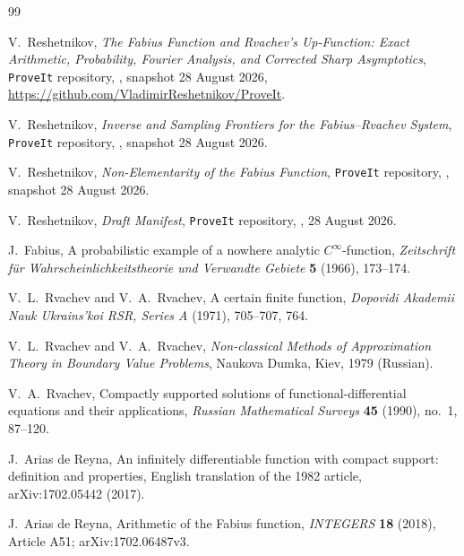\documentclass[11pt,oneside]{article}
\theoremstyle{definition}
\theoremstyle{remark}
\newcommand{\Repo}{\texttt{ProveIt}}
\begin{document}
\begin{thebibliography}{99}

V.~Reshetnikov,
\newblock \emph{The Fabius Function and Rvachev's Up-Function: Exact Arithmetic, Probability, Fourier Analysis, and Corrected Sharp Asymptotics},
\newblock \Repo{} repository, , snapshot 28 August 2026,
\newblock \url{https://github.com/VladimirReshetnikov/ProveIt}.

V.~Reshetnikov,
\newblock \emph{Inverse and Sampling Frontiers for the Fabius--Rvachev System},
\newblock \Repo{} repository, , snapshot 28 August 2026.

V.~Reshetnikov,
\newblock \emph{Non-Elementarity of the Fabius Function},
\newblock \Repo{} repository, , snapshot 28 August 2026.

V.~Reshetnikov,
\newblock \emph{Draft Manifest},
\newblock \Repo{} repository, , 28 August 2026.

J.~Fabius,
\newblock A probabilistic example of a nowhere analytic $C^\infty$-function,
\newblock \emph{Zeitschrift f\"ur Wahrscheinlichkeitstheorie und Verwandte Gebiete} \textbf{5} (1966), 173--174.

V.~L.~Rvachev and V.~A.~Rvachev,
\newblock A certain finite function,
\newblock \emph{Dopovidi Akademii Nauk Ukrains'koi RSR, Series A} (1971), 705--707, 764.

V.~L.~Rvachev and V.~A.~Rvachev,
\newblock \emph{Non-classical Methods of Approximation Theory in Boundary Value Problems},
\newblock Naukova Dumka, Kiev, 1979 (Russian).

V.~A.~Rvachev,
\newblock Compactly supported solutions of functional-differential equations and their applications,
\newblock \emph{Russian Mathematical Surveys} \textbf{45} (1990), no.~1, 87--120.

J.~Arias de Reyna,
\newblock An infinitely differentiable function with compact support: definition and properties,
\newblock English translation of the 1982 article, arXiv:1702.05442 (2017).

J.~Arias de Reyna,
\newblock Arithmetic of the Fabius function,
\newblock \emph{INTEGERS} \textbf{18} (2018), Article A51; arXiv:1702.06487v3.


\end{thebibliography}
\end{document}

